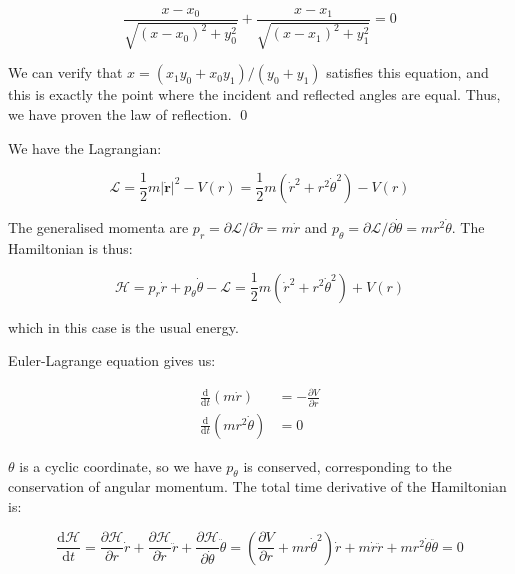 \documentclass[12pt]{article}
\begin{document}
\begin{equation}
    \frac{x - x_{0}}{\sqrt{(x - x_{0})^{2} + y_{0}^{2}}} + \frac{x - x_{1}}{\sqrt{(x - x_{1})^{2} + y_{1}^{2}}} = 0
\end{equation}

We can verify that $x = (x_{1}y_{0} + x_{0}y_{1})/(y_{0} + y_{1})$ satisfies this equation, and this is exactly the point where the incident and reflected angles are equal. Thus, we have proven the law of reflection.
\qed


We have the Lagrangian:

\begin{equation}
    \mathcal{L} = \frac{1}{2} m \left\lvert \dot{\mathbf{r}} \right\rvert^{2} - V(r) = \frac{1}{2} m (\dot{r}^{2} + r^{2} \dot{\theta}^{2}) - V(r)
\end{equation}

The generalised momenta are $p_{r} = \partial \mathcal{L}/\partial \dot{r} = m \dot{r}$ and $p_{\theta} = \partial \mathcal{L}/\partial \dot{\theta} = m r^{2} \dot{\theta}$. The Hamiltonian is thus:

\begin{equation}
    \mathcal{H} = p_{r} \dot{r} + p_{\theta} \dot{\theta} - \mathcal{L} = \frac{1}{2} m (\dot{r}^{2} + r^{2} \dot{\theta}^{2}) + V(r)
\end{equation}

which in this case is the usual energy.

Euler-Lagrange equation gives us:

\begin{equation}
\begin{split}
    \frac{\mathrm{d}}{\mathrm{d}t} \left( m \dot{r} \right) &= -\frac{\partial V}{\partial r} \\
    \frac{\mathrm{d}}{\mathrm{d}t} \left( m r^{2} \dot{\theta} \right) &= 0
\end{split}
\end{equation}

$\theta$ is a cyclic coordinate, so we have $p_{\theta}$ is conserved, corresponding to the conservation of angular momentum. The total time derivative of the Hamiltonian is:

\begin{equation}
    \frac{\mathrm{d}\mathcal{H}}{\mathrm{d}t} = \frac{\partial \mathcal{H}}{\partial r} \dot{r} + \frac{\partial \mathcal{H}}{\partial \dot{r}} \ddot{r} + \frac{\partial \mathcal{H}}{\partial \dot{\theta}} \ddot{\theta} = \left( \frac{\partial V}{\partial r} + mr \dot{\theta}^{2} \right) \dot{r} + m \dot{r} \ddot{r} + m r^{2} \dot{\theta} \ddot{\theta} = 0
\end{equation}
\end{document}
